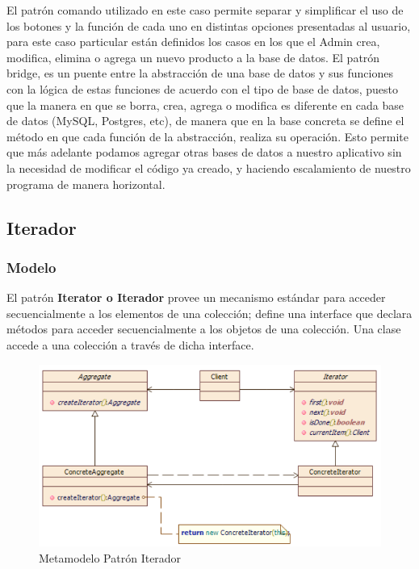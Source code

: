 El patrón comando utilizado en este caso permite separar y simplificar el uso de los botones y la función de cada uno en distintas opciones presentadas al usuario, para este caso particular están definidos los casos en los que el Admin crea, modifica, elimina o agrega un nuevo producto a la base de datos.
El patrón bridge, es un puente entre la abstracción de una base de datos y sus funciones con la lógica de estas funciones de acuerdo con el tipo de base de datos, puesto que la manera en que se borra, crea, agrega o modifica es diferente en cada base de datos (MySQL, Postgres, etc), de manera que en la base concreta se define el método en que cada función de la abstracción, realiza su operación. Esto permite que más adelante podamos agregar otras bases de datos a nuestro aplicativo sin la necesidad de modificar el código ya creado, y haciendo escalamiento de nuestro programa de manera horizontal.


\subsection{Iterador}
\subsubsection{Modelo}
El patrón \textbf{Iterator o Iterador} provee un mecanismo estándar para acceder secuencialmente a los elementos de una colección; define una interface que declara métodos para acceder secuencialmente a los objetos de una colección. Una clase accede a una colección a través de dicha interface.

\begin{figure}[th!]
	\centering
	\includegraphics[width=0.8\linewidth]{arquitectura/imagenes/modeloIterador}
	\caption{Metamodelo Patrón Iterador}
	\label{fig:metamodelo patron iterador}
\end{figure}

